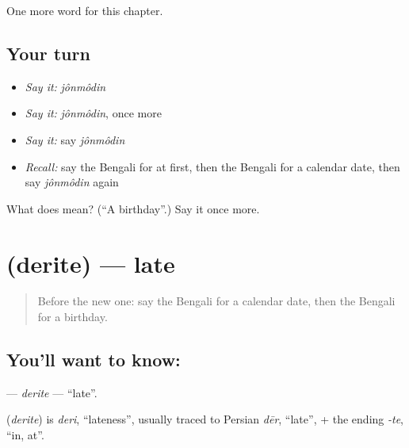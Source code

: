 \begin{grammarlens}[title={What you've built}]
One more word for this chapter.
\end{grammarlens}

\subsection*{Your turn}
\begin{itemize}
\raggedright
  \item \emph{Say it:} \emph{jônmôdin}
  \item \emph{Say it:} \emph{jônmôdin}, once more
  \item \emph{Say it:} say \emph{jônmôdin}
  \item \emph{Recall:} say the Bengali for at first, then the Bengali for a calendar date, then say \emph{jônmôdin} again
\end{itemize}

\begin{tcolorbox}[breakable,colback=teal!4,colframe=teal!35!black,title={Before you move on}]
What does  mean? (\textquotedblleft{}A birthday\textquotedblright{}.) Say it once more.
\end{tcolorbox}
\section[\texorpdfstring{\bn{দেরিতে} (derite)}{দেরিতে (derite)}]{ (derite) — late}

\label{lesson:BN-C156-derite}



\begin{quote}
Before the new one: say the Bengali for a calendar date, then the Bengali for a birthday.
\end{quote}

\subsection*{You'll want to know: }
\textbf{} — \emph{derite} — \textquotedblleft{}late\textquotedblright{}.

\begin{cousinweb}
\textbf{} (\emph{derite}) is \emph{deri}, \textquotedblleft{}lateness\textquotedblright{}, usually traced to Persian \emph{dēr}, \textquotedblleft{}late\textquotedblright{}, + the ending \emph{-te}, \textquotedblleft{}in, at\textquotedblright{}.
\end{cousinweb}

